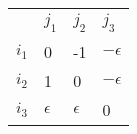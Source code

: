 \begin{center}
    \begin{tabular}{llll}
    \                           & $j_1$      & $j_2$      & $j_3$                            \\ \cline{2-4}
    \multicolumn{1}{l|}{$i_1$} & 0          & -1         & \multicolumn{1}{l|}{$-\epsilon$} \\
    \multicolumn{1}{l|}{$i_2$} & 1          & 0          & \multicolumn{1}{l|}{$-\epsilon$} \\
    \multicolumn{1}{l|}{$i_3$} & $\epsilon$ & $\epsilon$ & \multicolumn{1}{l|}{0}           \\ \cline{2-4}
    \end{tabular}
\end{center}